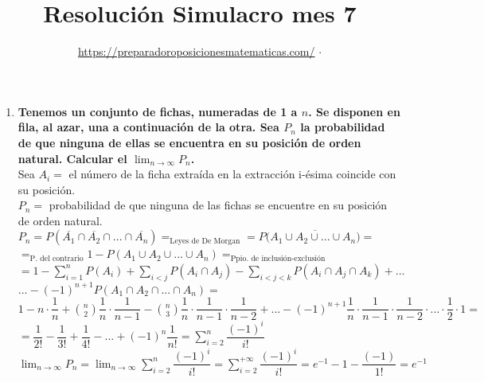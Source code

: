\documentclass[12pt,a4paper, reqno]{article}
\date{\href{https://preparadoroposicionesmatematicas.com}{https://preparadoroposicionesmatematicas.com/} $\cdot$ \text{Rev. 1.2}}
\title{\textbf{Resolución Simulacro mes 7}}
\begin{document}
\maketitle



\begin{enumerate}

 \item %
   \textbf{ Tenemos un conjunto de fichas, numeradas de 1 a $n$. Se disponen en fila, al azar, una a continuación de la otra. Sea $P_n$ la probabilidad de que ninguna de ellas se encuentra en su posición de orden natural. Calcular el $\lim_{n \rightarrow \infty} P_n$.}\\

   Sea $A_i=$ el número de la ficha extraída en la extracción i-ésima coincide con su posición. \\

   $P_n=$ probabilidad de que ninguna de las fichas se encuentre en su posición de orden natural.\\

   $P_n=P(\overline{A_1} \cap \overline{A_2} \cap ... \cap \overline{A_n})=_{\text{Leyes de De Morgan}}=P(\overline{A_1 \cup A_2 \cup ... \cup A_n)}=$\\

   $=_{\text{P. del contrario}} 1 - P(A_1 \cup A_2 \cup ... \cup A_n)=_{\text{Ppio. de inclusión-exclusión}}$\\

   $= 1- \sum_{i=1}^n P(A_i) + \sum_{i<j} P(A_i \cap A_j)-  \sum_{i<j<k} P(A_i \cap A_j \cap A_k)+ ...$\\

   $... - (-1)^{n+1} P(A_1 \cap A_2 \cap ... \cap A_n)=$\\

   $1-n \cdot \dfrac{1}{n}+ \displaystyle \binom{n}{2} \dfrac{1}{n} \cdot \dfrac{1}{n-1}- \displaystyle \binom{n}{3} \dfrac{1}{n} \cdot \dfrac{1}{n-1} \cdot \dfrac{1}{n-2}+...-(-1)^{n+1}\dfrac{1}{n} \cdot \dfrac{1}{n-1} \cdot \dfrac{1}{n-2} \cdot ... \cdot \dfrac{1}{2} \cdot 1 =$\\

   $=\dfrac{1}{2!}-\dfrac{1}{3!}+\dfrac{1}{4!}-...+(-1)^n\dfrac{1}{n!}= \sum_{i=2}^n \dfrac{(-1)^i}{i!}$\\

   $\lim_{n \rightarrow \infty} P_n =\lim_{n \rightarrow \infty} \sum_{i=2}^n \dfrac{(-1)^i}{i!} = \sum_{i=2}^{+\infty} \dfrac{(-1)^i}{i!}=e^{-1}-1-\dfrac{(-1)}{1!}= e^{-1}$




\end{enumerate}
\end{document}
